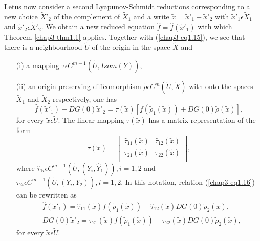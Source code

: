 Let\pageoriginale us now consider a second Lyapunov-Schmidt reductions
corresponding to a new choice $\widetilde{X}'_{2}$ of the complement
of $\widetilde{X}_{1}$ and a write $\widetilde{x} = \widetilde{x}'_{1}
+ \widetilde{x}'_{2}$ with $\widetilde{x}'_{1} \epsilon
\widetilde{X}_{1}$ and $\widetilde{x}'_{2} \epsilon
\widetilde{X}'_{2}$. We obtain a new reduced equation $\hat{f} =
\hat{f}(\widetilde{x}'_{1})$ with which Theorem \ref{chap3-thm1.1}
applies. Together with (\ref{chap3-eq1.15}), we see that there is a
neighbourhood $\widetilde{U}$ of the origin in the space
$\widetilde{X}$ and 
\begin{enumerate}
\item[(i)] a mapping $\tau \epsilon C^{m-1}(\widetilde{U}, Isom (Y))$,

\item[(ii)] an origin-preserving diffeomorphism $\widetilde{\rho}
  \epsilon C^{m} (\widetilde{U}, \widetilde{X})$ with onto the spaces
  $\widetilde{X}_{1}$ and $\widetilde{X}_{2}$ respectively, one has
\begin{equation*}
\hat{f}(\widetilde{x}'_{1}) + DG(0)\widetilde{x}'_{2} =
\tau(\widetilde{x}) \left[f(\widetilde{\rho}_{1}(\widetilde{x})) + DG(0)\widetilde{\rho}(\widetilde{x})\right],\tag{1.16}\label{chap3-eq1.16}
\end{equation*}
for every $\widetilde{x} \epsilon \widetilde{U}$. The linear mapping
$\tau(\widetilde{x})$ has a matrix representation of the form
\begin{equation*}
\tau(\widetilde{x}) = 
\begin{bmatrix}
\hat{\tau}_{11}(\widetilde{x}) & \hat{\tau}_{12}(\widetilde{x})\\
\tau_{21}(\widetilde{x}) & \tau_{22}(\widetilde{x})\\
\end{bmatrix}
,
\end{equation*}
where $\hat{\tau}_{1i} \epsilon C^{m-1}(\widetilde{U}, (Y_{i},
\hat{Y}_{1})), i = 1, 2$ and $\tau_{2i} \epsilon
C^{m-1}(\widetilde{U}, (Y_{i}, Y_{2})), i = 1, 2$. In this notation,
relation (\ref{chap3-eq1.16}) can be rewritten as
\begin{align*}
& \hat{f}(\widetilde{x}'_{1}) = \hat{\tau}_{11}(\widetilde{x})
  f(\widetilde{\rho}_{1}(\widetilde{x})) +
  \hat{\tau}_{12}(\widetilde{x}) DG(0)
  \widetilde{\rho}_{2}(\widetilde{x}),\tag{1.17}\label{chap3-eq1.17}\\
& DG(0) \widetilde{x}'_{2} = \tau_{21}(\widetilde{x})
  f(\widetilde{\rho}_{1}(\widetilde{x})) + \tau_{22}(\widetilde{x})
  DG(0) \widetilde{\rho}_{2} (\widetilde{x}),\tag{1.18}\label{chap3-eq1.18}
\end{align*}
for every $\widetilde{x} \epsilon \widetilde{U}$.
\end{enumerate}

